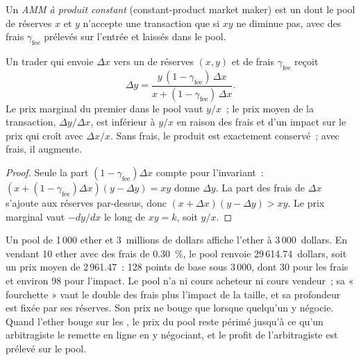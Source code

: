 \begin{definition}\label{def:m3:automated-market-makers:cp}
Un \emph{AMM à produit constant} (constant-product market maker) est un  dont le
pool de réserves $x$ et $y$ n'accepte une transaction que si $xy$ ne diminue pas, avec des frais $\gamma_{\mathrm{fee}}$ prélevés sur
l'entrée et laissés dans le pool.
\end{definition}

\begin{proposition}\label{prop:m3:automated-market-makers:swap}
Un trader qui envoie $\Delta x$ vers un  de réserves $(x, y)$ et de frais $\gamma_{\mathrm{fee}}$ reçoit
\[
\Delta y = \frac{y\,(1 - \gamma_{\mathrm{fee}})\,\Delta x}{x + (1 - \gamma_{\mathrm{fee}})\,\Delta x}.
\]
Le prix marginal du premier  dans le pool vaut $y/x$~; le prix moyen de la transaction, $\Delta y / \Delta x$, est inférieur
à $y/x$ en raison des frais et d'un impact sur le prix qui croît avec $\Delta x / x$. Sans frais, le produit est exactement conservé~;
avec frais, il augmente.
\end{proposition}

\begin{proof}
Seule la part $(1 - \gamma_{\mathrm{fee}})\Delta x$ compte pour l'invariant~: $(x + (1 - \gamma_{\mathrm{fee}})\Delta x)(y - \Delta y) = xy$
donne $\Delta y$. La part des frais de $\Delta x$ s'ajoute aux réserves par-dessus, donc $(x + \Delta x)(y - \Delta y) > xy$.
Le prix marginal vaut $-dy/dx$ le long de $xy = k$, soit $y/x$.
\end{proof}

Un pool de 1\,000 ether et 3~millions de dollars affiche l'ether à 3\,000~dollars. En vendant 10 ether avec des frais de 0.30~\%, le pool renvoie
29\,614.74~dollars, soit un prix moyen de 2\,961.47~: 128 points de base sous 3\,000, dont 30 pour les frais et environ 98 pour l'impact. Le pool n'a ni cours acheteur ni
cours vendeur~; sa « fourchette » vaut le double des frais plus l'impact de la taille, et sa profondeur est fixée par ses réserves. Son prix ne bouge
que lorsque quelqu'un y négocie. Quand l'ether bouge sur les , le prix du pool reste périmé jusqu'à
ce qu'un arbitragiste le remette en ligne en y négociant, et le profit de l'arbitragiste est prélevé sur le pool.

